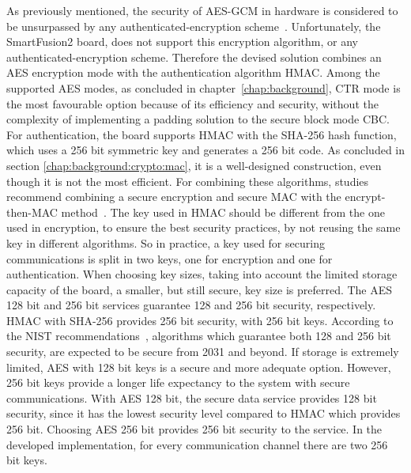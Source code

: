 As previously mentioned, the security of \ac{AES}-\ac{GCM} in hardware is considered to be unsurpassed by any authenticated-encryption scheme~\cite{aesmodes}.
Unfortunately, the SmartFusion2 board, does not support this encryption algorithm, or any authenticated-encryption scheme.
Therefore the devised solution combines an \ac{AES} encryption mode with the authentication algorithm \ac{HMAC}. Among the supported \ac{AES} modes, as concluded in chapter~\ref{chap:background}, CTR mode is the most favourable option because of its efficiency and security, without the complexity of implementing a padding solution to the secure block mode \ac{CBC}.
For authentication, the board supports \ac{HMAC} with the \ac{SHA}-256 hash function, which uses a 256 bit symmetric key and generates a 256 bit code. As concluded in section \ref{chap:background:crypto:mac}, it is a well-designed construction, even though it is not the most efficient.
For combining these algorithms, studies recommend combining a secure encryption and secure \ac{MAC} with the encrypt-then-MAC method~\cite{encryptmacorder}.
The key used in HMAC should be different from the one used in encryption, to ensure the best security practices, by not reusing the same key in different algorithms. So in practice, a key used for securing communications is split in two keys, one for encryption and one for authentication.
When choosing key sizes, taking into account the limited storage capacity of the board, a smaller, but still secure, key size is preferred. The \ac{AES} 128 bit and 256 bit services guarantee 128 and 256 bit security, respectively. HMAC with SHA-256 provides 256 bit security, with 256 bit keys. According to the \ac{NIST} recommendations~\cite{nistRecommendations}, algorithms which guarantee both 128 and 256 bit security, are expected to be secure from 2031 and beyond. If storage is extremely limited, AES with 128 bit keys is a secure and more adequate option. However, 256 bit keys provide a longer life expectancy to the system with secure communications.
With AES 128 bit, the secure data service provides 128 bit security, since it has the lowest security level compared to HMAC which provides 256 bit. Choosing AES 256 bit provides 256 bit security to the service.
In the developed implementation, for every communication channel there are two 256 bit keys.

